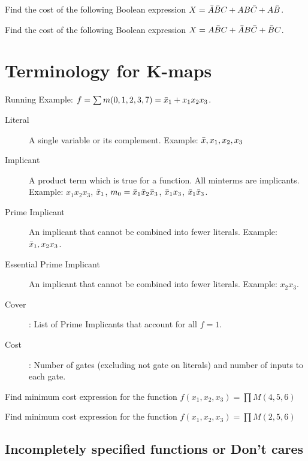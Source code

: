 \begin{example}
  Find the cost of the following Boolean expression $X = \bar{A}\bar{B} C + AB\bar{C} + A\bar{B}$.
\end{example}

\begin{prob}
  Find the cost of the following Boolean expression $X = A\bar{B} C + \bar{A} B\bar{C} + \bar{B}
  C$.
\end{prob}

\section{Terminology for K-maps}
Running Example: $f = \sum m(0, 1, 2, 3, 7) = \bar{x}_1 + x_1 x_2 x_3$.
\begin{description}
  \item[Literal] A single variable or its complement. Example: $\bar{x}, x_1, x_2, x_3$
  \item[Implicant] A product term which is true for a function. All minterms are
    implicants. Example: $x_1
    x_2 x_3$, $\bar{x}_1$, $m_0 = \bar{x}_1\bar{x}_2\bar{x}_3$, $\bar{x}_1 x_3$, $\bar{x}_1 \bar{x}_3$.
  \item [Prime Implicant] An implicant that cannot be combined into fewer
    literals. Example: $\bar{x}_1, x_2x_3$.
  \item [Essential Prime Implicant] An implicant that cannot be combined into
    fewer literals. Example: $x_2x_3$.
  \item [Cover] : List of Prime Implicants that account for all $f = 1$.
  \item [Cost]: Number of gates (excluding not gate on literals) and number of
      inputs to each gate.
\end{description}

\begin{example}
  Find minimum cost expression for the function $f(x_1, x_2, x_3) = \prod M(4, 5, 6)$
\end{example}
\vspace{10em}

\begin{prob}
  Find minimum cost expression for the function $f(x_1, x_2, x_3) = \prod M(2, 5, 6)$
\end{prob}
\vspace{10em}

\subsection{Incompletely specified functions or Don't cares}

